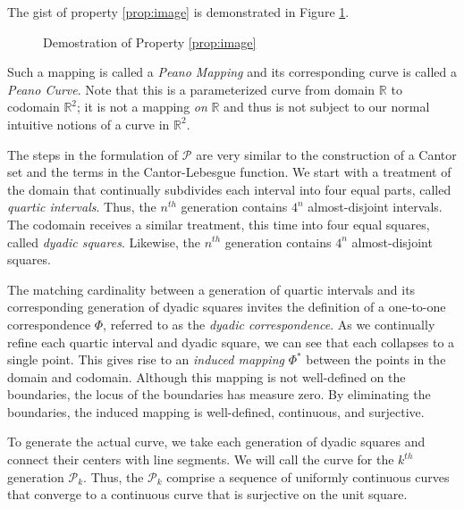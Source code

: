 \documentclass[letterpaper,12pt,fleqn,reqno]{amsart}
\newcommand{\R}{\mathbb{R}}
\newcommand{\pc}{\mathcal{P}}
\newcommand{\tick}[1]{\draw (#1,-0.1) -- (#1,0.1)}
\theoremstyle{plain}
\begin{document}
The gist of property \ref{prop:image} is demonstrated in Figure
\ref{fig:map}.

\begin{figure}[h]
\caption{Demostration of Property \ref{prop:image}}
\label{fig:map}
\end{figure}

Such a mapping is called a \emph{Peano Mapping} and its corresponding curve is
called a \emph{Peano Curve}. Note that this is a parameterized curve from
domain $\R$ to codomain $\R^2$; it is not a mapping \emph{on} $\R$ and thus is
not subject to our normal intuitive notions of a curve in $\R^2$.

The steps in the formulation of $\pc$ are very similar to the construction of a
Cantor set and the terms in the Cantor-Lebesgue function. We start with a
treatment of the domain that continually subdivides each interval into four
equal parts, called \emph{quartic intervals}. Thus, the $n^{th}$ generation
contains $4^n$ almost-disjoint intervals. The codomain receives a similar
treatment, this time into four equal squares, called \emph{dyadic squares}.
Likewise, the $n^{th}$ generation contains $4^n$ almost-disjoint squares.

The matching cardinality between a generation of quartic intervals and its
corresponding generation of dyadic squares invites the definition of a
one-to-one correspondence $\Phi$, referred to as the
\emph{dyadic correspondence}. As we continually refine each quartic interval
and dyadic square, we can see that each collapses to a single point. This
gives rise to an \emph{induced mapping} $\Phi^*$ between the points in the
domain and codomain. Although this mapping is not well-defined on the
boundaries, the locus of the boundaries has measure zero. By eliminating the
boundaries, the induced mapping is well-defined, continuous, and surjective.

To generate the actual curve, we take each generation of dyadic squares and
connect their centers with line segments. We will call the curve for the
$k^{th}$ generation $\pc_k$. Thus, the $\pc_k$ comprise a sequence of uniformly
continuous curves that converge to a continuous curve that is surjective on the
unit square.
\end{document}
